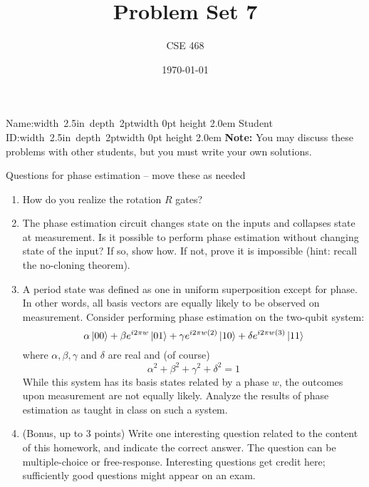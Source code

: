 \documentclass[12pt]{article}
\title{Problem Set 7}
\author{CSE 468}
\date{\today}
\newcommand{\NameBlank}{\mbox{\hskip 4pt\vrule width 2.5in depth 2pt}\vrule width 0pt height 2.0em}
\begin{document}
\maketitle

\noindent Name:\NameBlank{} \newline
\noindent Student ID:\NameBlank{} \newline
\textbf{Note:} You may discuss these problems with other students, but you must write your own solutions.

Questions for phase estimation -- move these as needed

\begin{enumerate}[font=\bfseries]
    \item How do you realize the rotation $R$ gates?
    \item The phase estimation circuit changes state on the inputs and collapses state at measurement.  Is it possible to perform phase estimation without changing state of the input?  If so, show how. If not, prove it is impossible (hint:  recall the no-cloning theorem).
    \item A period state was defined as one in uniform superposition except for phase.  In other words, all basis vectors are equally likely to be observed on measurement.  Consider performing phase estimation on the two-qubit system:
    \[ \alpha\ket{00} + \beta e^{i 2\pi w}\ket{01} 
        + \gamma e^{i 2\pi w(2)}\ket{10} + \delta e^{i 2\pi w(3)}\ket{11}
    \]
    where $\alpha, \beta, \gamma$ and $\delta$ are real and (of course)
    \[ \alpha^{2} + \beta^{2} + \gamma^{2} + \delta^{2}=1 \]
    While this system has its basis states related by a phase $w$, the outcomes upon measurement are not equally likely.  Analyze the results of phase estimation as taught in class on such a system.
    \item (Bonus, up to 3 points) Write one interesting question related to the content of this homework, and indicate the correct answer. The question can be multiple-choice or free-response.  Interesting questions get credit here;  sufficiently good questions might appear on an exam.
    
\end{enumerate}
\end{document}
